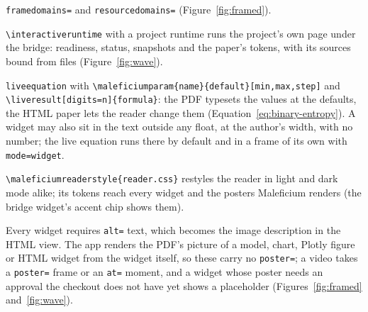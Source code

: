 \documentclass{article}
\theoremstyle{definition}
\begin{document}
\begin{description}
  \verb|framedomains=| and \verb|resourcedomains=| (Figure~\ref{fig:framed}).
\item[Custom runtime] \verb|\interactiveruntime| with a project runtime runs
  the project's own page under the bridge: readiness, status, snapshots and
  the paper's tokens, with its sources bound from files
  (Figure~\ref{fig:wave}).
\item[Live equation] \verb|liveequation| with \verb|\maleficiumparam{name}{default}[min,max,step]|
  and \verb|\liveresult[digits=n]{formula}|: the PDF typesets the values at the
  defaults, the HTML paper lets the reader change them
  (Equation~\eqref{eq:binary-entropy}). A widget may also sit in the text
  outside any float, at the author's width, with no number; the live equation
  runs there by default and in a frame of its own with \verb|mode=widget|.
\item[Reader style] \verb|\maleficiumreaderstyle{reader.css}| restyles the
  reader in light and dark mode alike; its tokens reach every widget and the
  posters Maleficium renders (the bridge widget's accent chip shows them).
\end{description}
Every widget requires \texttt{alt=} text, which becomes the image
description in the HTML view. The app renders the PDF's picture of a
model, chart, Plotly figure or HTML widget from the widget itself, so these carry no
\texttt{poster=}; a video takes a \texttt{poster=} frame or an \texttt{at=}
moment, and a widget whose poster needs an approval the checkout does not
have yet shows a placeholder (Figures~\ref{fig:framed} and~\ref{fig:wave}).



\end{document}
